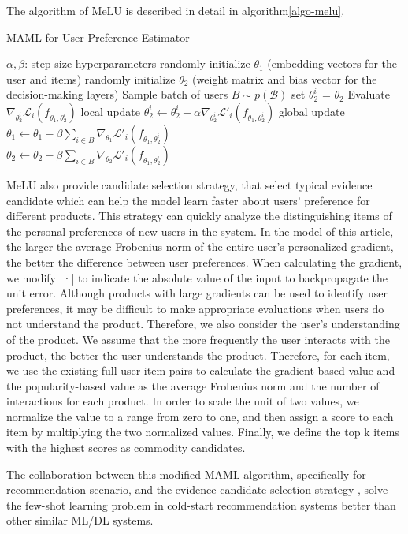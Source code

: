 The algorithm of MeLU is described in detail in algorithm\ref{algo-melu}.

\begin{algorithm}
    \caption{MAML for User Preference Estimator}
    \label{algo-melu}
    \begin{algorithmic}[1]
        \REQUIRE $\alpha, \beta$: step size hyperparameters
        \STATE randomly initialize $\theta_1$ (embedding vectors for the user and items)
        \STATE randomly initialize $\theta_2$ (weight matrix and bias vector for the decision-making layers)
        \STATE Sample batch of users $B \sim p(\mathcal{B})$
        \STATE set $\theta_2^i$ = $\theta_2$ 
        \STATE Evaluate $\nabla_{\theta_2^i} \mathcal{L}_i (f_{\theta_1,\theta_2^i})$
        \STATE local update $\theta_2^i \longleftarrow  \theta_2^i - \alpha\nabla_{\theta_2^i} \mathcal{L}'_i (f_{\theta_1,\theta_2^i})$
        \ENDFOR
        \STATE global update $\theta_1 \longleftarrow \theta_1 - \beta \sum_{i\in B}\nabla_{\theta_1} \mathcal{L}'_i (f_{\theta_1,\theta_2^i}) $   \\
        $\theta_2 \longleftarrow \theta_2 - \beta \sum_{i\in B}\nabla_{\theta_2} \mathcal{L}'_i (f_{\theta_1,\theta_2^i}) $  
        \ENDWHILE
    \end{algorithmic}
\end{algorithm}

MeLU also provide candidate selection strategy, that select typical evidence candidate which can help the model learn faster about users' preference for different products. 
This strategy can quickly analyze the distinguishing items of the personal preferences of new users in the system. In the model of this article, the larger the average Frobenius norm of the entire user's personalized gradient, the better the difference between user preferences. When calculating the gradient, we modify |·| to indicate the absolute value of the input to backpropagate the unit error. Although products with large gradients can be used to identify user preferences, it may be difficult to make appropriate evaluations when users do not understand the product. Therefore, we also consider the user’s understanding of the product. We assume that the more frequently the user interacts with the product, the better the user understands the product. Therefore, for each item, we use the existing full user-item pairs to calculate the gradient-based value and the popularity-based value as the average Frobenius norm and the number of interactions for each product. In order to scale the unit of two values, we normalize the value to a range from zero to one, and then assign a score to each item by multiplying the two normalized values. Finally, we define the top k items with the highest scores as commodity candidates.

The collaboration between this modified MAML algorithm, specifically for recommendation scenario, and the evidence candidate selection strategy , solve the few-shot learning problem in cold-start recommendation systems better than other similar ML/DL systems. 